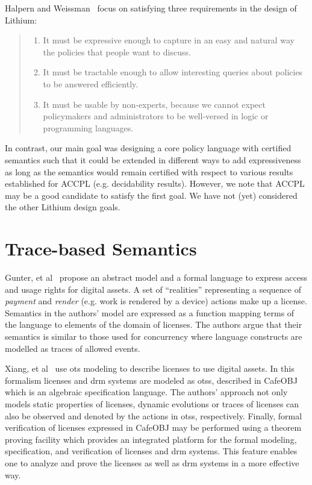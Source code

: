 Halpern and Weissman~\cite{Halpern2008} focus on satisfying three requirements in the design of Lithium:
\begin{quote}
\begin{enumerate}
  \item It must be expressive enough to capture in an easy and natural way the policies that people want to discuss.
  \item It must be tractable enough to allow interesting queries about policies to be answered efficiently.
  \item It must be usable by non-experts, because we cannot expect policymakers and administrators to be well-versed in logic or programming languages.
\end{enumerate}
\end{quote}

In contrast, our main goal was designing a core policy language with certified semantics such that it could be extended in different ways to add expressiveness as long as the semantics would remain certified with respect to various results established for \ac{ACCPL} (e.g. decidability results). However, we note that ACCPL may be a good candidate to satisfy the first goal.  We have not (yet) considered the other Lithium design goals.


\section{Trace-based Semantics}
Gunter, et al~\cite{GunterWW01} propose an abstract model and a formal language to express access and usage rights for digital assets. A set of ``realities'' representing a sequence of \emph{payment} and \emph{render} (e.g. work is rendered by a device) actions make up a license. Semantics in the authors' model are expressed as a function mapping terms of the language to elements of the domain of licenses. The authors argue that their semantics is similar to those used for concurrency where language constructs are modelled as traces of allowed events.

Xiang, et al~\cite{xiang2008formal} use \ac{ots} modeling to describe licenses to use digital assets. In this formalism licenses and \ac{drm} systems are modeled as \ac{ots}s, described in CafeOBJ~\cite{cafeobj} which is an algebraic specification language. The authors' approach not only models static properties of licenses, dynamic evolutions or traces of licenses can also be observed and denoted by the actions in \ac{ots}s, respectively. Finally, formal verification of licenses expressed in CafeOBJ may be performed using a theorem proving facility which provides an integrated platform for the formal modeling, specification, and verification of licenses and \ac{drm} systems. This feature enables one to analyze and prove the licenses as well as \ac{drm} systems in a more effective way.


